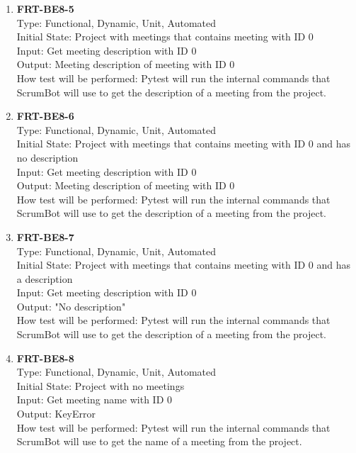 \documentclass[12pt, titlepage]{article}
\begin{document}
\begin{enumerate}
    \item{\textbf{FRT-BE8-5}}\\
    Type: Functional, Dynamic, Unit, Automated\\
    Initial State: Project with meetings that contains meeting with ID 0\\
    Input: Get meeting description with ID 0\\
    Output: Meeting description of meeting with ID 0\\
    How test will be performed: Pytest will run the internal commands that ScrumBot will use to get the description of a meeting from the project.
    
    \item{\textbf{FRT-BE8-6}}\\
    Type: Functional, Dynamic, Unit, Automated\\
    Initial State: Project with meetings that contains meeting with ID 0 and has no description\\
    Input: Get meeting description with ID 0\\
    Output: Meeting description of meeting with ID 0\\
    How test will be performed: Pytest will run the internal commands that ScrumBot will use to get the description of a meeting from the project.
    
    \item{\textbf{FRT-BE8-7}}\\
    Type: Functional, Dynamic, Unit, Automated\\
    Initial State: Project with meetings that contains meeting with ID 0 and has a description\\
    Input: Get meeting description with ID 0\\
    Output: "No description"\\
    How test will be performed: Pytest will run the internal commands that ScrumBot will use to get the description of a meeting from the project.
    
    \item{\textbf{FRT-BE8-8}}\\
    Type: Functional, Dynamic, Unit, Automated\\
    Initial State: Project with no meetings\\
    Input: Get meeting name with ID 0\\
    Output: KeyError\\
    How test will be performed: Pytest will run the internal commands that ScrumBot will use to get the name of a meeting from the project.
    

\end{enumerate}
\end{document}
